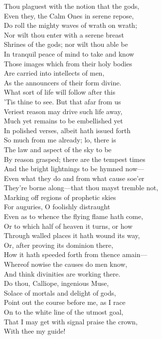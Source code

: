 Thou plaguest with the notion that the gods,\\
Even they, the Calm Ones in serene repose,\\
Do roll the mighty waves of wrath on wrath;\\
Nor wilt thou enter with a serene breast\\
Shrines of the gods; nor wilt thou able be\\
In tranquil peace of mind to take and know\\
Those images which from their holy bodies\\
Are carried into intellects of men,\\
As the announcers of their form divine.\\
What sort of life will follow after this\\
'Tis thine to see. But that afar from us\\
Veriest reason may drive such life away,\\
Much yet remains to be embellished yet\\
In polished verses, albeit hath issued forth\\
So much from me already; lo, there is\\
The law and aspect of the sky to be\\
By reason grasped; there are the tempest times\\
And the bright lightnings to be hymned now—\\
Even what they do and from what cause soe'er\\
They're borne along—that thou mayst tremble not,\\
Marking off regions of prophetic skies\\
For auguries, O foolishly distraught\\
Even as to whence the flying flame hath come,\\
Or to which half of heaven it turns, or how\\
Through walled places it hath wound its way,\\
Or, after proving its dominion there,\\
How it hath speeded forth from thence amain—\\
Whereof nowise the causes do men know,\\
And think divinities are working there.\\
Do thou, Calliope, ingenious Muse,\\
Solace of mortals and delight of gods,\\
Point out the course before me, as I race\\
On to the white line of the utmost goal,\\
That I may get with signal praise the crown,\\
With thee my guide!

